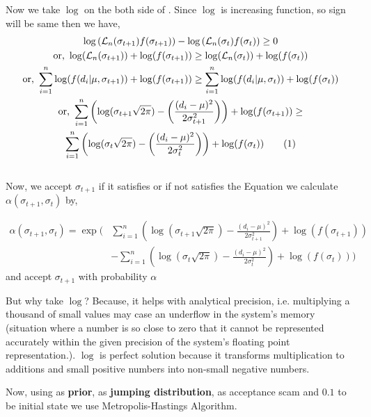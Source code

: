 \begin{example}
	Now we take $ \log $ on the both side of . Since $ \log $ is increasing function, so sign will be same then we have,
	\begin{gather*}
		\log \left(  \mathcal{L}_n(\sigma_{t+1})f(\sigma_{t+1}) \right) - \log \left(  \mathcal{L}_n(\sigma_{t})f(\sigma_{t})\right) \ge 0 \\
		\text{or, } \log( \mathcal{L}_n(\sigma_{t+1}) ) + \log(f(\sigma_{t+1})) \ge \log(\mathcal{L}_n(\sigma_t)) + \log(f(\sigma_t)) \\
		\text{or, } \sum_{i=1}^n \log(f(d_i|\mu,\sigma_{t+1})) + \log(f(\sigma_{t+1}))  \ge \sum_{i = 1}^{n} \log(f(d_i|\mu,\sigma_t)) + \log (f(\sigma_t))\\
		\text{or, } \sum_{i = 1}^{n} \left( \log(\sigma_{t+1}\sqrt{2 \pi}) - \left( \frac{(d_i - \mu)^2}{2 \sigma_{t+1}^2} \right) \right) + \log(f(\sigma_{t+1})) \ge \\ \sum_{i = 1}^{n} \left( \log(\sigma_{t}\sqrt{2 \pi}) - \left( \frac{(d_i - \mu)^2}{2 \sigma_{t}^2} \right) \right) + \log(f(\sigma_{t})) \label{eq:2nd accept mh example2} \numberthis
	\end{gather*} \\
	Now, we accept $ \sigma_{t+1} $ if it satisfies  or if not satisfies the Equation we calculate $ \alpha(\sigma_{t+1},\sigma_t) $ by,

	\begin{align*}
		\alpha(\sigma_{t+1}, \sigma_t) = \exp \bigg( & \sum_{i=1}^{n} \left( \log(\sigma_{t+1} \sqrt{2 \pi}) - \frac{(d_i - \mu)^2}{2 \sigma_{t+1}^2} \right) + \log(f(\sigma_{t+1})) \\
		                                             & - \sum_{i=1}^{n} \left( \log(\sigma_t \sqrt{2 \pi}) - \frac{(d_i - \mu)^2}{2 \sigma_t^2} \right) + \log(f(\sigma_t)) \bigg)
	\end{align*}
	and accept $ \sigma_{t+1} $ with probability $ \alpha $

	But why take $ \log $? Because, it helps with analytical precision, i.e. multiplying a thousand of small values may case an underflow in the system's memory (situation where a number is so close to zero that it cannot be represented accurately within the given precision of the system's floating point representation.). $ \log $ is perfect solution because it transforms multiplication to additions and small positive numbers into non-small negative numbers.

	Now, using  as \textbf{prior},  as \textbf{jumping distribution},  as acceptance scam and $0.1$ to be initial state we use Metropolis-Hastings Algorithm.


\end{example}
